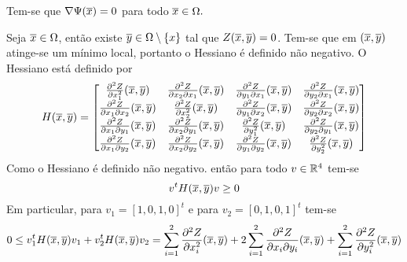 \begin{proposicao}\label{gradiente_nulo}
	Tem-se que $\nabla \Psi(\overline{x}) = 0$ para todo $\overline{x} \in \Omega.$
\end{proposicao}

\begin{demonstracao}
	Seja $\overline{x} \in \Omega$, então existe $\overline{y} \in \Omega \setminus \{x\}$ tal que $Z(\overline{x},\overline{y}) = 0$. Tem-se que em $(\overline{x},\overline{y})$ atinge-se um mínimo local, portanto o Hessiano é definido não negativo. O Hessiano está definido por
	\begin{equation*}
		H(\overline{x},\overline{y}) = \left[ \begin{matrix}
		\frac{\partial^2 Z}{\partial x_1^2}(\overline{x},\overline{y}) & \frac{\partial^2 Z}{\partial x_2 \partial x_1}(\overline{x},\overline{y}) & \frac{\partial^2 Z}{\partial y_1 \partial x_1}(\overline{x},\overline{y}) & \frac{\partial^2 Z}{\partial y_2 \partial x_1}(\overline{x},\overline{y})\\ 
		\frac{\partial^2 Z}{\partial x_1 \partial x_2}(\overline{x},\overline{y}) & \frac{\partial^2 Z}{\partial x_2^2}(\overline{x},\overline{y}) & \frac{\partial^2 Z}{\partial y_1 \partial x_2}(\overline{x},\overline{y}) & \frac{\partial^2 Z}{\partial y_2 \partial x_2}(\overline{x},\overline{y})\\
		 \frac{\partial^2 Z}{\partial x_1 \partial y_1}(\overline{x},\overline{y}) & \frac{\partial^2 Z}{\partial x_2 \partial y_1}(\overline{x},\overline{y}) & \frac{\partial^2 Z}{\partial y_1^2}(\overline{x},\overline{y}) & \frac{\partial^2 Z}{\partial y_2 \partial y_1}(\overline{x},\overline{y})\\
		  \frac{\partial^2 Z}{\partial x_1 \partial y_2}(\overline{x},\overline{y}) & \frac{\partial^2 Z}{\partial x_2 \partial y_2}(\overline{x},\overline{y}) & \frac{\partial^2 Z}{\partial y_1 \partial y_2}(\overline{x},\overline{y}) & \frac{\partial^2 Z}{\partial y_2^2}(\overline{x},\overline{y})
		\end{matrix} \right]
	\end{equation*}	
	Como o Hessiano é definido não negativo. então para todo $v \in \mathbb{R}^4$ tem-se
	\begin{equation*}
		v^t H(\overline{x},\overline{y}) v \geq 0
	\end{equation*}	
	Em particular, para $v_1 = [1,0,1,0]^t$ e para $v_2 = [0,1,0,1]^t$ tem-se
	\begin{equation*}
		0 \leq v_1^t H(\xbarra,\ybarra) v_1 + v_2^t H(\xbarra,\ybarra) v_ 2 = \sum_{i=1}^2 \frac{\partial^2 Z}{\partial x_i^2}(\xbarra,\ybarra) + 2 \sum_{i=1}^2 \frac{\partial^2 Z}{\partial x_i \partial y_i}(\xbarra,\ybarra) + \sum_{i=1}^2 \frac{\partial^2 Z}{\partial y_i^2}(\xbarra,\ybarra)

\end{equation*}
\end{demonstracao}
